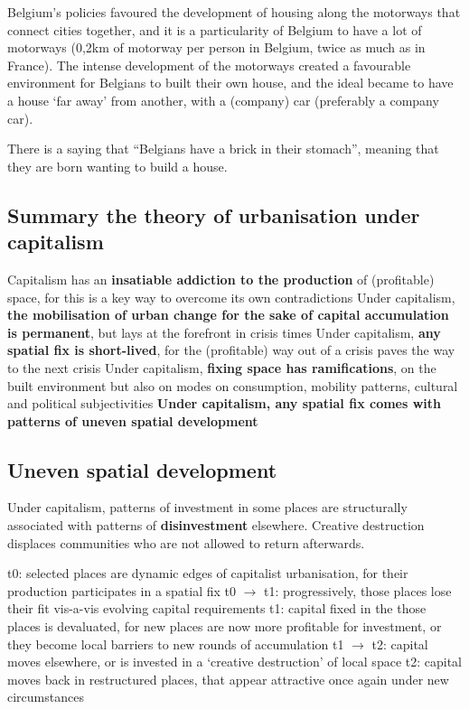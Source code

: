 \documentclass{article}
\begin{document}
Belgium's policies favoured the development of housing along the motorways that connect cities together, and it is a particularity of Belgium to have a lot of motorways (0,2km of motorway per person in Belgium, twice as much as in France). The intense development of the motorways created a favourable environment for Belgians to built their own house, and the ideal became to have a house `far away' from another, with a (company) car (preferably a company car). 

There is a saying that ``Belgians have a brick in their stomach'', meaning that they are born wanting to build a house.

\subsection{Summary the theory of urbanisation under capitalism}

\begin{outline}
	\1 Capitalism has an \textbf{insatiable addiction to the production} of (profitable) space, for this is a key way to overcome its own contradictions
	\1Under capitalism, \textbf{the mobilisation of urban change for the sake of capital accumulation is permanent}, but lays at the forefront in crisis times
	\1 Under capitalism, \textbf{any spatial fix is short-lived}, for the (profitable) way out of a crisis paves the way to the next crisis
	\1 Under capitalism, \textbf{fixing space has ramifications}, on the built environment but also on modes on consumption, mobility patterns, cultural and political subjectivities
	\1 \textbf{Under capitalism, any spatial fix comes with patterns of uneven spatial development}
\end{outline}

\subsection{Uneven spatial development}

Under capitalism, patterns of investment in some places are structurally associated with patterns of \textbf{disinvestment} elsewhere. Creative destruction displaces communities who are not allowed to return afterwards.

\begin{outline} 
	\1 t0: selected places are dynamic edges of capitalist urbanisation, for their production participates in a spatial fix
	\1 t0 $\rightarrow$ t1: progressively, those places lose their fit vis-a-vis evolving capital requirements
	\1 t1: capital fixed in the those places is devaluated, for new places are now more profitable for investment, or they become local barriers to new rounds of accumulation
	\1 t1 $\rightarrow$ t2: capital moves elsewhere, or is invested in a `creative destruction' of local space
	\1 t2: capital moves back in restructured places, that appear attractive once again under new circumstances
\end{outline}
\end{document}

